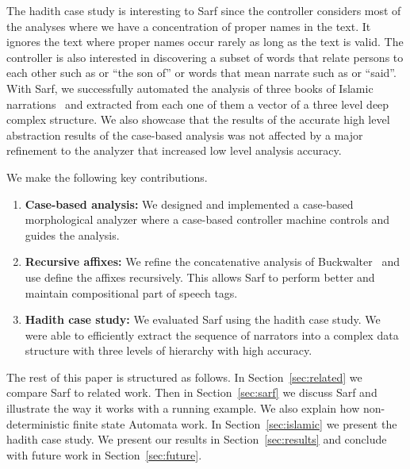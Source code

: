 \documentclass[11pt,letterpaper]{article}
\begin{document}
The hadith case study is interesting to Sarf since the controller
considers most of the analyses where we have a concentration
of proper names in the text. It ignores the text where
proper names occur rarely as long 
as the text is valid.
The controller is also interested in discovering a subset of words 
that relate persons to each other such as  or ``the son of''
or words that mean narrate such as  or ``said''. 
With Sarf, we successfully automated the analysis of 
three books of Islamic narrations~\cite{IbnHanbal,AlTousi,AlKulayni}
and extracted from each one of them a vector of a three level deep
complex structure. 
We also showcase that the results of the accurate high level abstraction
results of the case-based analysis was not affected by a major
refinement to the analyzer that increased low level analysis accuracy. 


We make the following key contributions. 
\begin{enumerate}
\item {\bf Case-based analysis:}  We designed and implemented
a case-based morphological analyzer where a case-based controller
machine controls and guides the analysis. 
\item {\bf Recursive affixes:}
We refine the concatenative analysis of 
Buckwalter~  and use define the affixes
recursively. 
This allows Sarf to perform better and 
maintain compositional part of speech tags.
\item {\bf Hadith case study:}
We evaluated Sarf using the hadith case study. We were able to
efficiently extract the sequence of narrators into a complex
data structure with three levels of hierarchy with high accuracy. 
\end{enumerate}


The rest of this paper is structured as follows. In Section~\ref{sec:related}
we compare Sarf to related work. Then in Section~\ref{sec:sarf}
we discuss Sarf and illustrate the way it works with a running example.
We also explain how non-deterministic finite state Automata
work. In Section~\ref{sec:islamic} we present the hadith case
study. We present our results in Section~\ref{sec:results}
and conclude with future work in Section~\ref{sec:future}.
\end{document}
